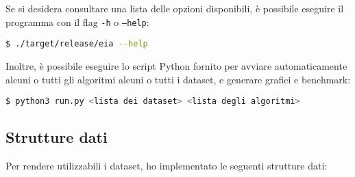 \documentclass{article}
\begin{document}
Se si desidera consultare una lista delle opzioni disponibili, è possibile eseguire il programma con il flag \texttt{-h} o \texttt{--help}:

\lstinline[language=bash]|$ ./target/release/eia --help|
\vspace*{1em}

Inoltre, è possibile eseguire lo script Python fornito per avviare automaticamente alcuni o tutti
gli algoritmi alcuni o tutti i dataset, e generare grafici e benchmark:

\lstinline[language=bash]|$ python3 run.py <lista dei dataset> <lista degli algoritmi>|

\subsection{Strutture dati}
Per rendere utilizzabili i dataset, ho implementato le seguenti strutture dati:
\end{document}
